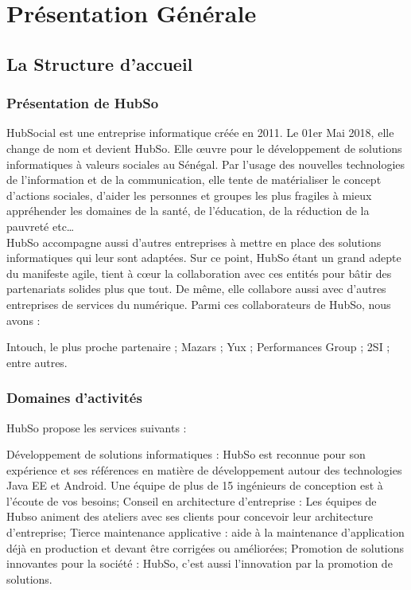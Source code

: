 \chapter{Présentation Générale}
\minitoc
\clearpage
%

\section{La Structure d'accueil}

\subsection{Présentation de HubSo}
HubSocial est une entreprise informatique créée en 2011. Le 01er Mai 2018, elle change de nom et devient HubSo. Elle œuvre pour le développement de solutions informatiques à valeurs sociales au Sénégal. Par l’usage des nouvelles technologies de l'information et de la communication, elle tente de matérialiser le concept d’actions sociales, d’aider les personnes et groupes les plus fragiles à mieux appréhender les domaines de la santé, de l’éducation, de la réduction de la pauvreté etc…\\
HubSo accompagne aussi d'autres entreprises à mettre en place des solutions informatiques qui leur sont adaptées. Sur ce point, HubSo étant un grand adepte du manifeste agile, tient à cœur la collaboration avec ces entités pour bâtir des partenariats solides plus que tout. De même, elle collabore aussi avec d'autres entreprises de services du numérique. Parmi ces collaborateurs de HubSo, nous avons : 
\begin{itemize}
	\itemtirait Intouch, le plus proche partenaire ;
	\itemtirait Mazars ;
	\itemtirait Yux ;
	\itemtirait Performances Group ;
	\itemtirait 2SI ;
	\itemtirait entre autres.
\end{itemize}

\subsection{Domaines d'activités}
HubSo propose les services suivants : 
\begin{itemize}
	\itemcheck Développement de solutions informatiques : HubSo est reconnue pour son expérience et ses références en matière de développement autour des technologies Java EE et Android. Une équipe de plus de 15 ingénieurs de conception est à l'écoute de vos besoins; 
	\itemcheck Conseil en architecture d'entreprise : Les équipes de Hubso animent des ateliers avec ses clients  pour concevoir leur architecture d'entreprise; 
	\itemcheck Tierce maintenance applicative : aide à la maintenance d'application déjà en production et devant être corrigées ou améliorées; 
	\itemcheck Promotion de solutions innovantes pour la société : HubSo, c'est aussi l'innovation par la promotion de solutions.
\end{itemize}


